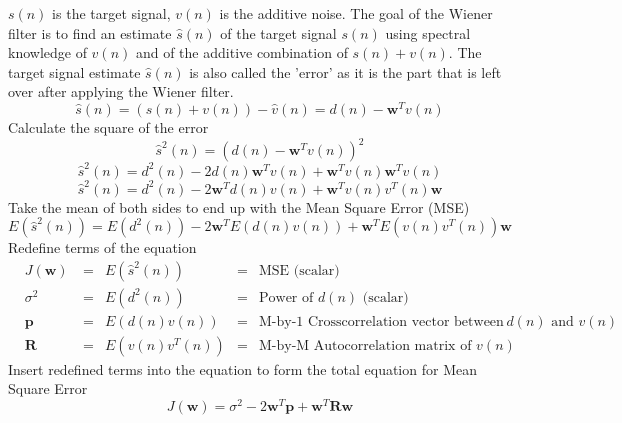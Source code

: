 $s(n)$ is the target signal, $v(n)$ is the additive noise. The goal of the Wiener filter is to find an estimate $\hat{s}(n)$ of the target signal $s(n)$ using spectral knowledge of $v(n)$ and of the additive combination of $s(n)+v(n)$. The target signal estimate $\hat{s}(n)$ is also called the 'error' as it is the part that is left over after applying the Wiener filter.
  \begin{equation}\label{eq:start_wiener}
    \hat{s}(n) = (s(n) + v(n)) - \hat{v}(n) = d(n) - \boldsymbol{w}^T v(n)
  \end{equation}
Calculate the square of the error \cite{lecture_adaptive_filters_1}
\begin{equation}
    \hat{s}^2(n) = (d(n) - \boldsymbol{w}^T v(n))^2
\end{equation}
\begin{equation}
    \hat{s}^2(n) = d^2(n) - 2d(n)\boldsymbol{w}^T v(n) + \boldsymbol{w}^T v(n)\boldsymbol{w}^T v(n)
\end{equation}
\begin{equation}
    \hat{s}^2(n) = d^2(n) - 2 \boldsymbol{w}^T d(n) v(n) + \boldsymbol{w}^T v(n) v^T(n) \boldsymbol{w}
\end{equation}
Take the mean of both sides to end up with the Mean Square Error (MSE) \cite{lecture_adaptive_filters_1}
\begin{equation}
    E(\hat{s}^2(n)) = E(d^2(n)) - 2 \boldsymbol{w}^T E(d(n) v(n)) + \boldsymbol{w}^T E(v(n) v^T(n)) \boldsymbol{w}
\end{equation}
Redefine terms of the equation \cite{lecture_adaptive_filters_1}
\begin{align}
&J(\boldsymbol{w}) \                  &=& E(\hat{s}^2(n))  &=& \text{MSE (scalar)} \label{eq:wiener_mse_def}\\
&\sigma^2 \           &=& E(d^2(n))        &=& \text{Power of }d(n) \text{ (scalar)} \\
&\boldsymbol{p} \      &=& E(d(n) v(n))     &=& \text{M-by-1 Crosscorrelation vector between } d(n) \text{ and } v(n)  \\
&\boldsymbol{R} \      &=& E(v(n) v^T(n))  &=& \text{M-by-M Autocorrelation matrix of } v(n)
\end{align}
Insert redefined terms into the equation to form the total equation for Mean Square Error \cite{lecture_adaptive_filters_1}
\begin{equation}
    J(\boldsymbol{w}) = \sigma^2 - 2 \boldsymbol{w}^T \boldsymbol{p} + \boldsymbol{w}^T \boldsymbol{R} \boldsymbol{w}
\end{equation}

